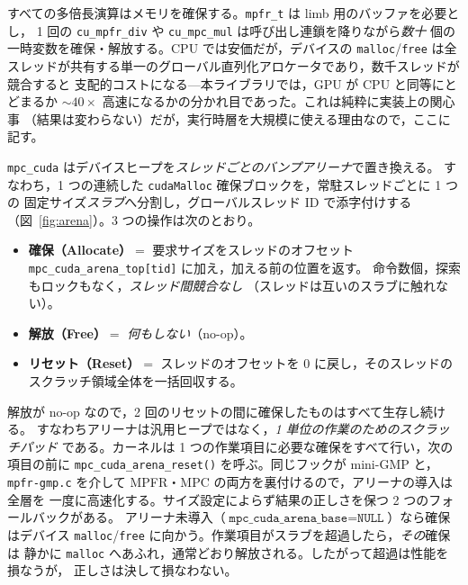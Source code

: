\documentclass[uplatex,dvipdfmx,a4paper,11pt]{jsarticle}
\newcommand{\code}[1]{\texttt{#1}}
\begin{document}
すべての多倍長演算はメモリを確保する。\code{mpfr\_t} は limb 用のバッファを必要とし，
1 回の \code{cu\_mpfr\_div} や \code{cu\_mpc\_mul} は呼び出し連鎖を降りながら\emph{数十}
個の一時変数を確保・解放する。CPU では安価だが，デバイスの \code{malloc}/\code{free}
は全スレッドが共有する単一のグローバル直列化アロケータであり，数千スレッドが競合すると
支配的コストになる---本ライブラリでは，GPU が CPU と同等にとどまるか
$\sim\!40\times$ 高速になるかの分かれ目であった。これは純粋に実装上の関心事
（結果は変わらない）だが，実行時層を大規模に使える理由なので，ここに記す。

\code{mpc\_cuda} はデバイスヒープを\emph{スレッドごとのバンプアリーナ}で置き換える。
すなわち，1 つの連続した \code{cudaMalloc} 確保ブロックを，常駐スレッドごとに 1 つの
固定サイズ\emph{スラブ}へ分割し，グローバルスレッド ID で添字付けする
（図~\ref{fig:arena}）。3 つの操作は次のとおり。
\begin{itemize}
  \item \textbf{確保（Allocate）}$=$ 要求サイズをスレッドのオフセット
        \code{mpc\_cuda\_arena\_top[tid]} に加え，加える前の位置を返す。
        命令数個，探索もロックもなく，\emph{スレッド間競合なし}
        （スレッドは互いのスラブに触れない）。
  \item \textbf{解放（Free）}$=$ \emph{何もしない}（no-op）。
  \item \textbf{リセット（Reset）}$=$ スレッドのオフセットを 0 に戻し，そのスレッドの
        スクラッチ領域全体を一括回収する。
\end{itemize}
解放が no-op なので，2 回のリセットの間に確保したものはすべて生存し続ける。
すなわちアリーナは汎用ヒープではなく，\emph{1 単位の作業のためのスクラッチパッド}
である。カーネルは 1 つの作業項目に必要な確保をすべて行い，次の項目の前に
\code{mpc\_cuda\_arena\_reset()} を呼ぶ。同じフックが mini-GMP と，
\code{mpfr-gmp.c} を介して MPFR・MPC の両方を裏付けるので，アリーナの導入は全層を
一度に高速化する。サイズ設定によらず結果の正しさを保つ 2 つのフォールバックがある。
アリーナ未導入（$\code{mpc\_cuda\_arena\_base}=\texttt{NULL}$）なら確保はデバイス
\code{malloc}/\code{free} に向かう。作業項目がスラブを超過したら，\emph{その}確保は
静かに \code{malloc} へあふれ，通常どおり解放される。したがって超過は性能を損なうが，
正しさは決して損なわない。
\end{document}
